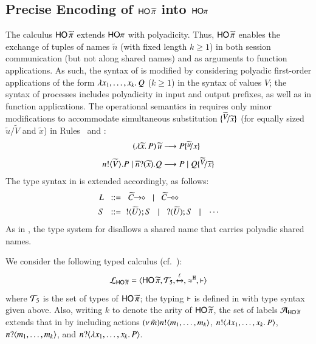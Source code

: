 \documentclass[preprint,11pt]{elsarticle}
\begin{document}
{{\subsection{Precise Encoding of $\mathsf{HO}\,{\widetilde{\pi}}$ into $\mathsf{HO}\pi$}\label{ss:poly}
The calculus  
$\mathsf{HO}\,{\widetilde{\pi}}$ 
extends $\mathsf{HO}\pi$ 
with polyadicity.
Thus, $\mathsf{HO}\,{\widetilde{\pi}}$  enables the exchange of tuples of names $\widetilde{n}$ (with fixed length $k \geq 1$) in both session communication (but not along shared names) and as arguments 
to function applications.
As such, the syntax of
is modified by considering  
polyadic first-order applications of the form
 $\lambda x_1, \ldots, x_k.\,Q$ ($k \geq 1$)
 in the syntax of values $V$;
the syntax of processes includes polyadicity in input and output prefixes, 
 as well as in function applications. 
The operational semantics in  requires only minor modifications to accommodate simultaneous substitution $\subst{\widetilde{V}}{\widetilde{x}}$ (for equally sized $\widetilde{u}/\widetilde{V}$ and $\widetilde{x}$)
in Rules~ and :
	\begin{align*}
		\appl{(\abs{\widetilde{x}}{P})}{\widetilde{u}}   & \red  P \subst{\widetilde{u}}{x} 
		\\[1mm]
		\bout{n}{\widetilde{V}} P \Par \binp{\dual{n}}{\widetilde{x}} Q & \red  P \Par Q \subst{\widetilde{V}}{\widetilde{x}} 
	\end{align*}
The type syntax in  is extended accordingly, as follows:
%
\begin{align*}
		L & \bnfis \shot{\widetilde{C}} \bnfbar \lhot{\widetilde{C}}
		\\
		S & \bnfis  \btout{\widetilde{U}} S \bnfbar \btinp{\widetilde{U}} S \bnfbar \cdots
\end{align*}
As in \cite{tlca07,MostrousY15},
the type system for \PHOp 
disallows a shared name that carries polyadic
shared names.

We consider the following typed calculus
 (cf.~):
	$$\mathcal{L}_{\mathsf{HO}\,{\widetilde{\pi}}}=\langle \mathsf{HO}\,{\widetilde{\pi}}, {\cal{T}}_5, \xmapsto{\ell}, \approx^\mathtt{H}, \vdash \rangle$$
where 
	${\cal{T}}_5$ is the set of types of $\mathsf{HO}\,{\widetilde{\pi}}$;  
the typing $\vdash$ is defined
in 
with  type syntax given above.
Also, writing $k$ to denote the arity of $\mathsf{HO}\,{\widetilde{\pi}}$, the set of labels 
$\mathcal{A}_{\mathsf{HO}\,{\widetilde{\pi}}}$ extends that in  by 
including actions
$(\nu\, \tilde{m}) n ! \langle m_1, \ldots, m_k \rangle$,
$n ! \langle \lambda x_1, \ldots, x_k.\,P \rangle$,
$ n ? \langle m_1, \ldots, m_k \rangle$,
and
$n ? \langle \lambda x_1, \ldots, x_k.\,P \rangle$.

}}
\end{document}
